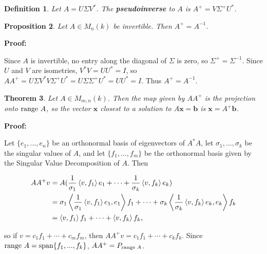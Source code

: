 \documentclass{article}
\theoremstyle{colontheorem}
\newtheorem{theorem}{Theorem}[section]
\newtheorem{proposition}[theorem]{Proposition}
\newtheorem{definition}[theorem]{Definition}
\newcommand{\Span}{\textnormal{span}}
\newcommand{\Range}{\textnormal{range }}
\newenvironment{Theorem}
{
	\begin{mdframed}[backgroundcolor=TheoremOrange!10]
	\begin{theorem}
}
{
	\end{theorem}
	\end{mdframed}
	
	\vspace{.15in}
}
\newenvironment{Proposition}
{
	\begin{mdframed}[backgroundcolor=TheoremOrange!10]
	\begin{proposition}
}
{
	\end{proposition}
	\end{mdframed}
	
	\vspace{.15in}
}
\newenvironment{Def}
{
	\begin{mdframed}[backgroundcolor=DefGreen!10]
	\begin{definition}
}
{
	\end{definition}
	\end{mdframed}
	
	\vspace{.15in}
}
\newenvironment{Proof}
{
	\vspace{-.3in}
	
	\begin{mdframed}[backgroundcolor=ProofPurple!10]
	\textbf{Proof:}%
}
{
	\end{mdframed}
	
	\vspace{.15in}
}
\begin{document}
\begin{Def}
	
	Let $A = U \Sigma V^*$. The \textbf{pseudoinverse} to $A$ is $A^+ = V \Sigma^+ U^*$.
	
\end{Def}



\begin{Proposition}
	
	Let $A \in M_n(k)$ be invertible. Then $A^+ = A^{-1}$.
	
\end{Proposition}



\begin{Proof}
	Since $A$ is invertible, no entry along the diagonal of $\Sigma$ is zero, so $\Sigma^+ = \Sigma^{-1}$. Since $U$ and $V$ are isometries, $V^* V = U U^* = I$, so $AA^+ = U \Sigma V^* V \Sigma^+ U^* = U \Sigma \Sigma^+ U^* = U U^* = I$. Thus $A^+ = A^{-1}$.
	
\end{Proof}



\begin{Theorem}
	
	Let $A \in M_{m, n}(k)$. Then the map given by $AA^+$ is the projection onto $\Range A$, so the vector $\mathbf{x}$ closest to a solution to $A\mathbf{x} = \mathbf{b}$ is $\mathbf{x} = A^+ \mathbf{b}$.
	
\end{Theorem}



\begin{Proof}
	Let $\{e_1, ..., e_n\}$ be an orthonormal basis of eigenvectors of $A^* A$, let $\sigma_1, ..., \sigma_k$ be the singular values of $A$, and let $\{f_1, ..., f_m\}$ be the orthonormal basis given by the Singular Value Decomposition of $A$. Then
	
	\begin{align*}
		AA^+ v &= A(\frac{1}{\sigma_1} \left< v, f_1 \right> e_1 + \cdots + \frac{1}{\sigma_k} \left< v, f_k \right> e_k)\\
		&= \sigma_1 \left< \frac{1}{\sigma_1} \left< v, f_1 \right> e_1, e_1 \right> f_1 + \cdots + \sigma_k \left< \frac{1}{\sigma_k} \left< v, f_k \right> e_k, e_k \right> f_k\\
		&= \left< v, f_1 \right> f_1 + \cdots + \left< v, f_k \right> f_k \textnormal{,}
	\end{align*}
	
	so if $v = c_1 f_1 + \cdots + c_m f_m$, then $AA^+ v = c_1 f_1 + \cdots + c_k f_k$. Since $\Range A = \Span \{f_1, ..., f_k\}$, $AA^+ = P_{\Range A}$.
	
\end{Proof}
\end{document}
